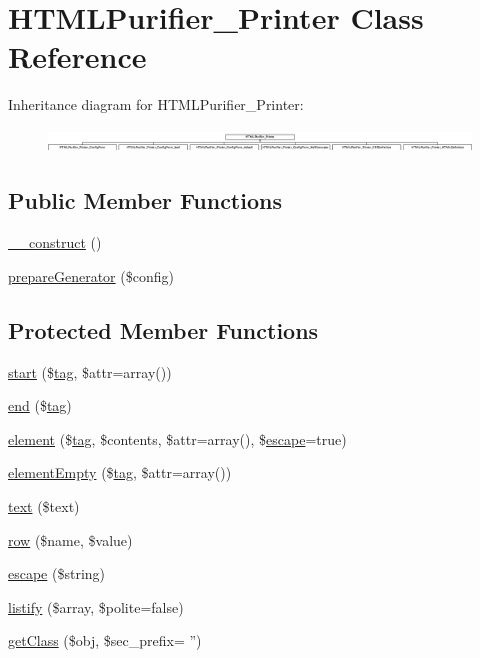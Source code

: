 \hypertarget{classHTMLPurifier__Printer}{\section{H\+T\+M\+L\+Purifier\+\_\+\+Printer Class Reference}
\label{classHTMLPurifier__Printer}
}
Inheritance diagram for H\+T\+M\+L\+Purifier\+\_\+\+Printer\+:\begin{figure}[H]
\begin{center}
\leavevmode
\includegraphics[height=0.622222cm]{classHTMLPurifier__Printer}
\end{center}
\end{figure}
\subsection*{Public Member Functions}
\begin{DoxyCompactItemize}
\item 
\hyperlink{classHTMLPurifier__Printer_ade50508d804cc7ab88e5dc7fdba0d81b}{\+\_\+\+\_\+construct} ()
\item 
\hyperlink{classHTMLPurifier__Printer_a6456fde5054ed0881d3e45120463e2bf}{prepare\+Generator} (\$config)
\end{DoxyCompactItemize}
\subsection*{Protected Member Functions}
\begin{DoxyCompactItemize}
\item 
\hyperlink{classHTMLPurifier__Printer_aeaf50062292eea27ec1b6592a408c5a9}{start} (\$\hyperlink{classtag}{tag}, \$attr=array())
\item 
\hyperlink{classHTMLPurifier__Printer_a55a9c792d420367017253224ac356a64}{end} (\$\hyperlink{classtag}{tag})
\item 
\hyperlink{classHTMLPurifier__Printer_a1aaad3c9dc929e40dd1e564cbbd2c1c8}{element} (\$\hyperlink{classtag}{tag}, \$contents, \$attr=array(), \$\hyperlink{classHTMLPurifier__Printer_a965de9a0bc82487976afa66165a31182}{escape}=true)
\item 
\hyperlink{classHTMLPurifier__Printer_a60dcb33d34cf6a39a73e3051139b9b4e}{element\+Empty} (\$\hyperlink{classtag}{tag}, \$attr=array())
\item 
\hyperlink{classHTMLPurifier__Printer_a7475ba2f4accc33f08f15a230f04ec19}{text} (\$text)
\item 
\hyperlink{classHTMLPurifier__Printer_a0a17db3937fbaff9e4f6117fa4cf5c17}{row} (\$name, \$value)
\item 
\hyperlink{classHTMLPurifier__Printer_a965de9a0bc82487976afa66165a31182}{escape} (\$string)
\item 
\hyperlink{classHTMLPurifier__Printer_aa2c153067b8607e0124ffc7384427ead}{listify} (\$array, \$polite=false)
\item 
\hyperlink{classHTMLPurifier__Printer_a87cb7f8c684c4076ab3f4a3f616d831e}{get\+Class} (\$obj, \$sec\+\_\+prefix= '')
\end{DoxyCompactItemize}

